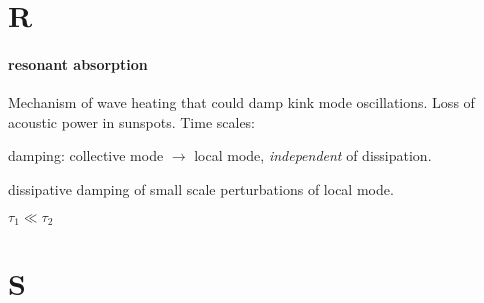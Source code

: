 \documentclass[12pt]{article}
\begin{document}
\section*{R}
\paragraph{resonant absorption}
Mechanism of wave heating that could damp kink mode oscillations.
Loss of acoustic power in sunspots. Time scales:
\begin{enumerate*}
    \item damping: collective mode $\rightarrow$ local mode,
        \emph{independent} of dissipation.
    \item dissipative damping of small scale perturbations of local
        mode.
\end{enumerate*}
$\tau_1 \ll \tau_2$

\section*{S}
\end{document}
